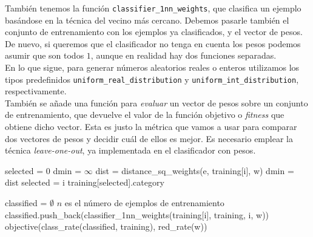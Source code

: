 \documentclass[12pt]{article}
\begin{document}
También tenemos la función \verb|classifier_1nn_weights|, que clasifica un ejemplo basándose en la técnica del vecino más cercano. Debemos pasarle también el conjunto de entrenamiento con los ejemplos ya clasificados, y el vector de pesos. De nuevo, si queremos que el clasificador no tenga en cuenta los pesos podemos asumir que son todos $1$, aunque en realidad hay dos funciones separadas.\\

En lo que sigue, para generar números aleatorios reales o enteros utilizamos los tipos predefinidos \verb|uniform_real_distribution| y \verb|uniform_int_distribution|, respectivamente.\\

También se añade una función para \textit{evaluar} un vector de pesos sobre un conjunto de entrenamiento, que devuelve el valor de la función objetivo o \textit{fitness} que obtiene dicho vector. Esta es justo la métrica que vamos a usar para comparar dos vectores de pesos y decidir cuál de ellos es mejor. Es necesario emplear la técnica \textit{leave-one-out}, ya implementada en el clasificador con pesos.

\begin{algorithm}[h]
\begin{algorithmic}

     \State selected = $0$
     \State dmin = $\infty$
       
            \State dist = distance\_sq\_weights(e, training[i], w)
                \State dmin = dist
                \State selected = i
            \EndIf
         \EndIf
     \EndFor
     \State \Return training[selected].category
\EndFunction

\end{algorithmic}
\end{algorithm}

\begin{algorithm}[ht]
\begin{algorithmic}

    \State classified = $\emptyset$
      \Comment $n$ es el número de ejemplos de entrenamiento
        \State classified.push\_back(classifier\_1nn\_weights(training[i], training, i, w))
    \EndFor
\State \Return objective(class\_rate(classified, training), red\_rate(w))
\EndFunction

\end{algorithmic}
\end{algorithm}
\end{document}

